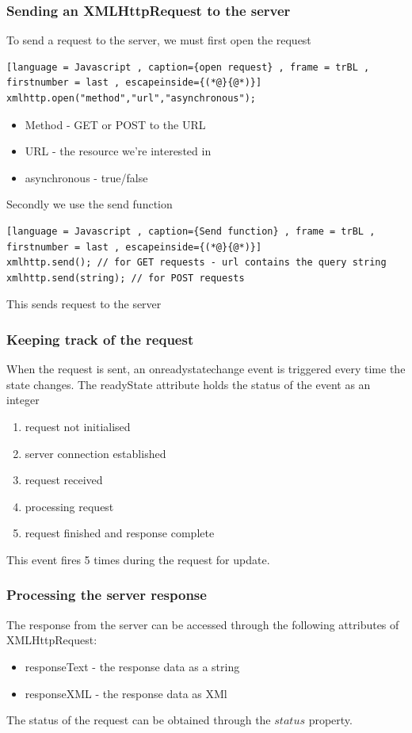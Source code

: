 \documentclass[a4paper]{article}
\theoremstyle{plain}
\theoremstyle{definition}
\theoremstyle{remark}
\begin{document}
\begin{flushleft}
\subsubsection{Sending an XMLHttpRequest to the server}
To send a request to the server, we must first open the request
\begin{lstlisting}[language = Javascript , caption={open request} , frame = trBL , firstnumber = last , escapeinside={(*@}{@*)}]
xmlhttp.open("method","url","asynchronous");
\end{lstlisting}
\begin{itemize}
	\item Method - GET or POST to the URL
	\item URL - the resource we're interested in
	\item asynchronous - true/false
\end{itemize}
Secondly we use the send function
\begin{lstlisting}[language = Javascript , caption={Send function} , frame = trBL , firstnumber = last , escapeinside={(*@}{@*)}]
xmlhttp.send(); // for GET requests - url contains the query string
xmlhttp.send(string); // for POST requests
\end{lstlisting}
This sends request to the server
\subsubsection{Keeping track of the request}
When the request is sent, an onreadystatechange event is triggered every time the state changes. The readyState attribute holds the status of the event as an integer
\begin{enumerate}
	\item request not initialised
	\item server connection established
	\item request received
	\item processing request
	\item request finished and response complete	
\end{enumerate}
This event fires 5 times during the request for update.
\subsubsection{Processing the server response}
The response from the server can be accessed through the following attributes of XMLHttpRequest:
\begin{itemize}
	\item responseText - the response data as a string
	\item responseXML - the response data as XMl
\end{itemize}
The status of the request can be obtained through the $status$ property.

\end{flushleft}
\end{document}
